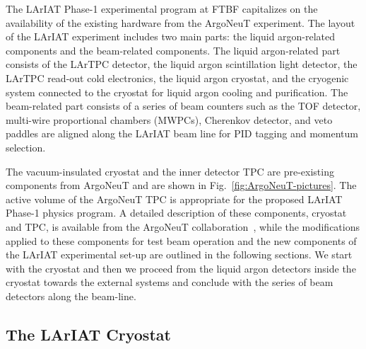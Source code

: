 \documentclass[DIV=calc, paper=a4, fontsize=10pt, twocolumn]{scrartcl}	 %
\begin{document}
{The LArIAT Phase-1 experimental program at FTBF capitalizes on the availability of the existing hardware from the ArgoNeuT experiment.  The layout of the LArIAT experiment includes two main parts: the liquid argon-related components and the beam-related components. The liquid argon-related part consists of the LArTPC detector, the liquid argon scintillation light detector, the LArTPC read-out cold electronics, the liquid argon cryostat, and the cryogenic system connected to the cryostat for liquid argon cooling and purification. The beam-related part consists of a series of beam counters such as the TOF detector, multi-wire proportional chambers (MWPCs), Cherenkov detector, and veto paddles are aligned along the {\sf LArIAT} beam line for PID tagging and momentum selection.

The vacuum-insulated cryostat and the inner detector TPC are pre-existing components from ArgoNeuT and are shown in Fig.~\ref{fig:ArgoNeuT-pictures}. The active volume of the ArgoNeuT TPC is appropriate for the proposed {\sf LArIAT} Phase-1 physics program.  A detailed description of these components, cryostat and TPC, is available from the ArgoNeuT collaboration~\cite{tech_paper}, while the  modifications applied to these components for test beam operation and the new components of the LArIAT experimental set-up are outlined in the following sections. We start with the cryostat and then we proceed from the liquid argon detectors inside the cryostat towards the external systems and conclude with the series of beam detectors  along the beam-line.

\subsection{The LArIAT Cryostat}

}
\end{document}
